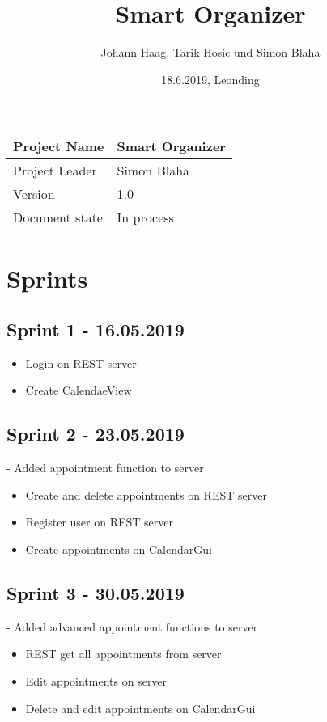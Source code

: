\documentclass[12pt]{scrartcl}
\title{Smart Organizer}
\author{Johann Haag, Tarik Hosic und Simon Blaha}
\date{18.6.2019, Leonding}
\begin{document}
    \maketitle
    \begin{flushleft}
    \begin{tabular}{|l|l|}
    \hline
    Project Name & Smart Organizer \\ \hline
    Project Leader & Simon Blaha \\ \hline
    Version & 1.0\\ \hline
    Document state & In process \\ \hline
    \end{tabular}
    \end{flushleft}

    \pagebreak
    \tableofcontents
    \pagebreak

    \section{Sprints}
    \subsection{Sprint 1 - 16.05.2019}
    \begin{itemize}
        \item Login on REST server
        \item Create CalendaeView
    \end{itemize}

    \subsection{Sprint 2 - 23.05.2019}
    - Added appointment function to server
    \begin{itemize}
        \item Create and delete appointments on REST server
        \item Register user on REST server
        \item Create appointments on CalendarGui
    \end{itemize}

    \subsection{Sprint 3 - 30.05.2019}
    - Added advanced appointment functions to server
    \begin{itemize}
        \item REST get all appointments from server
        \item Edit appointments on server
        \item Delete and edit appointments on CalendarGui
    \end{itemize}
\end{document}
